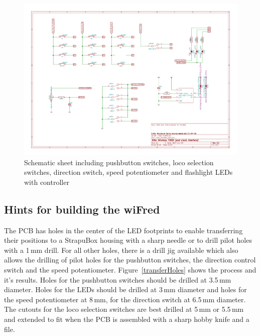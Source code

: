 \documentclass[11pt,a4paper]{scrartcl}
\begin{document}
\begin{figure}[tbh]
  \centering
  \includegraphics[width=\textwidth]{images/User_interface_rev2-User_Interface}
  \caption{Schematic sheet including pushbutton switches, loco selection switches, direction switch, speed potentiometer and flashlight LEDs with controller}
  \label{schematicPage4}
\end{figure}

\subsection{Hints for building the wiFred}

The PCB has holes in the center of the LED footprints to enable transferring their positions to a StrapuBox housing with a sharp needle or to drill pilot holes with a 1\,mm drill. For all other holes, there is a drill jig available which also allows the drilling of pilot holes for the pushbutton switches, the direction control switch and the speed potentiometer. Figure~\ref{transferHoles} shows the process and it's results. Holes for the pushbutton switches should be drilled at 3.5\,mm diameter. Holes for the LEDs should be drilled at 3\,mm diameter and holes for the speed potentiometer at 8\,mm, for the direction switch at 6.5\,mm diameter. The cutouts for the loco selection switches are best drilled at 5\,mm or 5.5\,mm and extended to fit when the PCB is assembled with a sharp hobby knife and a file.
\end{document}
